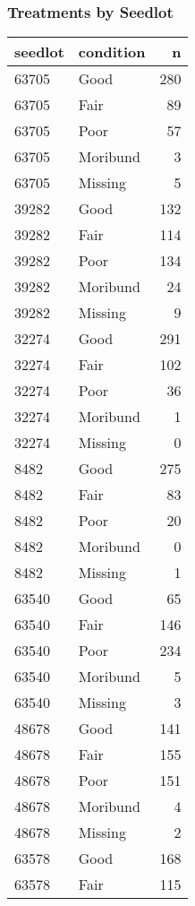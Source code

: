 \documentclass[
]{article}
\begin{document}
\hypertarget{treatments-by-seedlot}{%
\subsubsection{Treatments by Seedlot}\label{treatments-by-seedlot}}

\begin{tabular}{l|l|r}
\hline
seedlot & condition & n\\
\hline
63705 & Good & 280\\
\hline
63705 & Fair & 89\\
\hline
63705 & Poor & 57\\
\hline
63705 & Moribund & 3\\
\hline
63705 & Missing & 5\\
\hline
39282 & Good & 132\\
\hline
39282 & Fair & 114\\
\hline
39282 & Poor & 134\\
\hline
39282 & Moribund & 24\\
\hline
39282 & Missing & 9\\
\hline
32274 & Good & 291\\
\hline
32274 & Fair & 102\\
\hline
32274 & Poor & 36\\
\hline
32274 & Moribund & 1\\
\hline
32274 & Missing & 0\\
\hline
8482 & Good & 275\\
\hline
8482 & Fair & 83\\
\hline
8482 & Poor & 20\\
\hline
8482 & Moribund & 0\\
\hline
8482 & Missing & 1\\
\hline
63540 & Good & 65\\
\hline
63540 & Fair & 146\\
\hline
63540 & Poor & 234\\
\hline
63540 & Moribund & 5\\
\hline
63540 & Missing & 3\\
\hline
48678 & Good & 141\\
\hline
48678 & Fair & 155\\
\hline
48678 & Poor & 151\\
\hline
48678 & Moribund & 4\\
\hline
48678 & Missing & 2\\
\hline
63578 & Good & 168\\
\hline
63578 & Fair & 115\\

\end{tabular}
\end{document}
